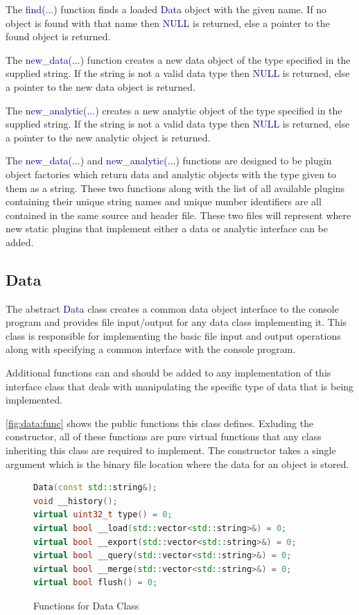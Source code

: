 \documentclass[10pt]{article}
\providecommand{\h}[1]{\textcolor{darkblue}{#1}}
\begin{document}
The \h{find(...)} function finds a loaded \h{Data} object with the given name. 
If no object is found with that name then \h{NULL} is returned, else a 
pointer to the found object is returned.

The \h{new\_data(...)} function creates a new data object of the type 
specified in the supplied string. If the string is not a valid data type then 
\h{NULL} is returned, else a pointer to the new data object is returned.

The \h{new\_analytic(...)} creates a new analytic object of the type specified 
in the supplied string. If the string is not a valid data type then \h{NULL} is 
returned, else a pointer to the new analytic object is returned.

The \h{new\_data(...)} and \h{new\_analytic(...)} functions are designed to be 
plugin object factories which return data and analytic objects with the type 
given to them as a string. These two functions along with the list of all 
available plugins containing their unique string names and unique number 
identifiers are all contained in the same source and header file. These two 
files will represent where new static plugins that implement either a data or 
analytic interface can be added.

\subsection{Data}

The abstract \h{Data} class creates a common data object interface to the 
console program and provides file input/output for any data class implementing 
it. This class is responsible for implementing the basic file input and output 
operations along with specifying a common interface with the console program.

Additional functions can and should be added to any implementation of this 
interface class that deals with manipulating the specific type of data that is 
being implemented.

\autoref{fig:data:func} shows the public functions this class defines. 
Exluding the constructor, all of these functions are pure virtual functions 
that any class inheriting this class are required to implement. The constructor 
takes a single argument which is the binary file location where the data for an 
object is stored.

\begin{figure}[H]
\begin{mdframed}[style=functions]
\begin{lstlisting}[language=C++]
Data(const std::string&);
void __history();
virtual uint32_t type() = 0;
virtual bool __load(std::vector<std::string>&) = 0;
virtual bool __export(std::vector<std::string>&) = 0;
virtual bool __query(std::vector<std::string>&) = 0;
virtual bool __merge(std::vector<std::string>&) = 0;
virtual bool flush() = 0;
\end{lstlisting}
\end{mdframed}
\caption{Functions for Data Class}
\label{fig:data:func}
\end{figure}
\end{document}
